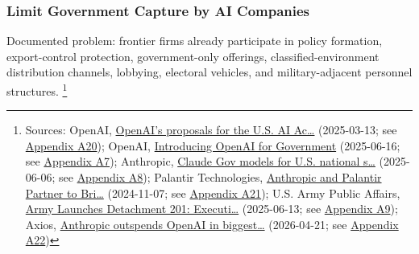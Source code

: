 \documentclass[
  american,
  11pt,
  letterpaper,
]{article}
\begin{document}
\subsubsection{Limit Government Capture by AI
Companies}\label{limit-government-capture-by-ai-companies}

Documented problem: frontier firms already participate in policy
formation, export-control protection, government-only offerings,
classified-environment distribution channels, lobbying, electoral
vehicles, and military-adjacent personnel structures. \footnote{Sources:
  OpenAI,
  \href{https://openai.com/global-affairs/openai-proposals-for-the-us-ai-action-plan/}{OpenAI's
  proposals for the U.S. AI Ac\ldots{}} (2025-03-13; see
  \hyperref[appendix-a20-openais-proposals-for-the-us-ai-action-plan]{Appendix
  A20}); OpenAI,
  \href{https://openai.com/global-affairs/introducing-openai-for-government/}{Introducing
  OpenAI for Government} (2025-06-16; see
  \hyperref[appendix-a7-introducing-openai-for-government]{Appendix
  A7}); Anthropic,
  \href{https://www.anthropic.com/news/claude-gov-models-for-u-s-national-security-customers}{Claude
  Gov models for U.S. national s\ldots{}} (2025-06-06; see
  \hyperref[appendix-a8-claude-gov-models-for-u-s-national-security-customers]{Appendix
  A8}); Palantir Technologies,
  \href{https://investors.palantir.com/news-details/2024/Anthropic-and-Palantir-Partner-to-Bring-Claude-AI-Models-to-AWS-for-U.S.-Government-Intelligence-and-Defense-Operations/}{Anthropic
  and Palantir Partner to Bri\ldots{}} (2024-11-07; see
  \hyperref[appendix-a21-anthropic-and-palantir-partner-to-bring-claude-ai-models-to-aws-for-u-s-government-intelligence-and-defense-operations]{Appendix
  A21}); U.S. Army Public Affairs,
  \href{https://www.army.mil/article/286317/army_launches_detachment_201_executive_innovation_corps_to_drive_tech_transformation}{Army
  Launches Detachment 201: Executi\ldots{}} (2025-06-13; see
  \hyperref[appendix-a9-army-launches-detachment-201-executive-innovation-corps-to-drive-tech-transformation]{Appendix
  A9}); Axios,
  \href{https://www.axios.com/2026/04/21/anthropic-outspends-openai-biggest-lobbying-quarter}{Anthropic
  outspends OpenAI in biggest\ldots{}} (2026-04-21; see
  \hyperref[appendix-a22-anthropic-outspends-openai-in-biggest-ever-lobbying-quarter]{Appendix
  A22})}
\end{document}
